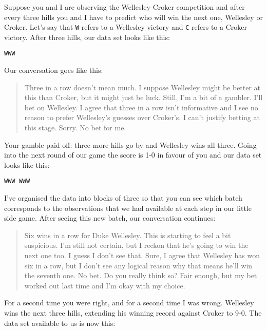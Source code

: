 Suppose you and I are observing the Wellesley-Croker competition and after every three hills you and I have to predict who will win the next one, Wellesley or Croker. Let's say that \texttt{W} refers to a Wellesley victory and \texttt{C} refers to a Croker victory. After three hills, our data set looks like this:

\begin{verbatim}
WWW
\end{verbatim}

\noindent
Our conversation goes like this:
\begin{quote}
\begin{dialogue}
 Three in a row doesn't mean much. I suppose Wellesley might be better at this than Croker, but it might just be luck. Still, I'm a bit of a gambler. I'll bet on Wellesley.
 I agree that three in a row isn't informative and I see no reason to prefer Wellesley's guesses over Croker's. I can't justify betting at this stage. Sorry. No bet for me.
\end{dialogue}
\end{quote}

Your gamble paid off: three more hills go by and Wellesley wins all three. Going into the next round of our game the score is 1-0 in favour of you and our data set looks like this:

\begin{verbatim}
WWW WWW
\end{verbatim}

\noindent
I've organised the data into blocks of three so that you can see which batch corresponds to the observations that we had available at each step in our little side game. After seeing this new batch, our conversation continues:

\begin{quote}
\begin{dialogue}
 Six wins in a row for Duke Wellesley. This is starting to feel a bit suspicious. I'm still not certain, but I reckon that he's going to win the next one too.
 I guess I don't see that. Sure, I agree that Wellesley has won six in a row, but I don't see any logical reason why that means he'll win the seventh one. No bet.
 Do you really think so? Fair enough, but my bet worked out last time and I'm okay with my choice.
\end{dialogue}
\end{quote}

For a second time you were right, and for a second time I was wrong. Wellesley wins the next three hills, extending his winning record against Croker to 9-0. The data set available to us is now this:
 
